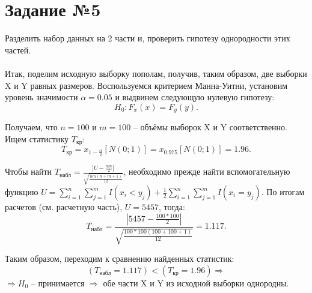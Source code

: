 \documentclass[12pt, letterpaper, twoside]{article}
\begin{document}
\section{Задание №5}
Разделить набор данных на 2 части и, проверить гипотезу однородности этих частей. \\ \\

Итак, поделим исходную выборку пополам, получив, таким образом, две выборки X и Y равных размеров. Воспользуемся критерием Манна-Уитни, установим уровень значимости $\alpha = 0.05$ и выдвинем следующую нулевую гипотезу: $$H_0: F_x(x) = F_y(y).$$

Получаем, что $n = 100$ и $m = 100$ -- объёмы выборок X и Y соответственно. Ищем статистику $T_{\text{кр}}$: $$T_{\text{кр}} = x_{1-\frac{\alpha}{2}}[N(0;1)] = x_{0.975}[N(0;1)] = 1.96.$$

Чтобы найти $T_{\text{набл}} = \frac{|U - \frac{nm}{2}|}{\sqrt{\frac{nm(n+m+1)}{12}}}$, необходимо прежде найти вспомогательную функцию $U = \sum_{i=1}^n\sum_{j=1}^m I(x_i < y_j) + \frac{1}{2} \sum_{i=1}^n\sum_{j=1}^m I(x_i = y_j)$. По итогам расчетов (см. расчетную часть), $U = 5457$, тогда: $$T_{\text{набл}} = \frac{|5457 - \frac{100*100}{2}|}{\sqrt{\frac{100*100(100+100+1)}{12}}} = 1.117.$$

Таким образом, переходим к сравнению найденных статистик: $$(T_{\text{набл}} = 1.117) < (T_{\text{кр}} = 1.96) \Rightarrow$$ $\Rightarrow H_0$ -- принимается $\Rightarrow$ обе части X и Y из исходной выборки однородны.
\end{document}
